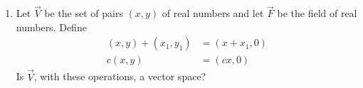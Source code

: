 \renewcommand{\theequation}{\theenumi}
\renewcommand{\thefigure}{\theenumi}
\begin{enumerate}[label=\thesubsection.\arabic*.,ref=\thesubsection.\theenumi]
%
\item Let $\vec{V}$ be the  set of pairs $(x,y)$ of real numbers and let $\vec{F}$ be the field of real numbers. Define
\begin{align}
    (x,y)+(x_1,y_1) &= (x+x_1,0) \label{eq:solutions/2/1/7/eq:eq1}\\
    c(x,y) &= (cx,0)
\end{align}
Is $\vec{V}$, with these operations, a vector space?
\\
\solution

\end{enumerate}


